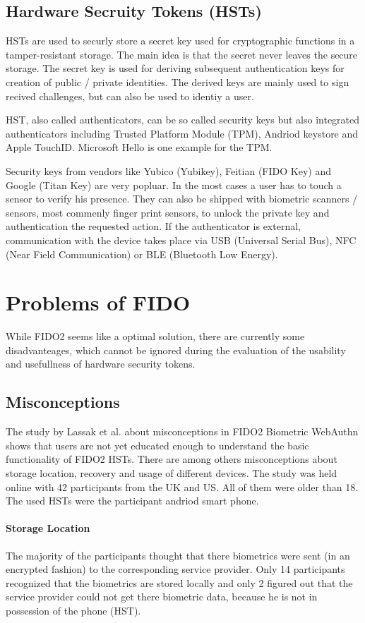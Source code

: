 \documentclass[runningheads]{llncs}
\begin{document}
\subsection{Hardware Secruity Tokens (HSTs)}
HSTs are used to securly store a secret key used for cryptographic functions in a tamper-resistant storage. The main idea is that the secret never leaves the secure storage. The secret key is used for deriving subsequent authentication keys for creation of public / private identities. The derived keys are mainly used to sign recived challenges, but can also be used to identiy a user.\cite{272198}

HST, also called authenticators, can be so called security keys but also integrated authenticators including Trusted Platform Module (TPM), Andriod keystore and Apple TouchID. Microsoft Hello is one example for the TPM.

Security keys from vendors like Yubico (Yubikey), Feitian (FIDO Key) and Google (Titan Key) are very popluar. In the most cases a user has to touch a sensor to verify his presence. They can also be shipped with biometric scanners / sensors, most commenly finger print sensors, to unlock the private key and authentication the requested action. If the authenticator is external, communication with the device takes place via USB (Universal Serial Bus), NFC (Near Field Communication) or BLE (Bluetooth Low Energy).\cite{9152694}

\section{Problems of FIDO}
While FIDO2 seems like a optimal solution, there are currently some disadvanteages, which cannot be ignored during the evaluation of the usability and usefullness of hardware security tokens.

\subsection{Misconceptions}
The study by Lassak et al.\cite{274547} about misconceptions in FIDO2 Biometric WebAuthn shows that users are not yet educated enough to understand the basic functionality of FIDO2 HSTs. There are among others misconceptions about storage location, recovery and usage of different devices. The study was held online with 42 participants from the UK and US. All of them were older than 18. The used HSTs were the participant andriod smart phone.

\paragraph{Storage Location}
The majority of the participants thought that there biometrics were sent (in an encrypted fashion) to the corresponding service provider. Only 14 participants recognized that the biometrics are stored locally and only 2 figured out that the service provider could not get there biometric data, because he is not in possession of the phone (HST).
\end{document}
